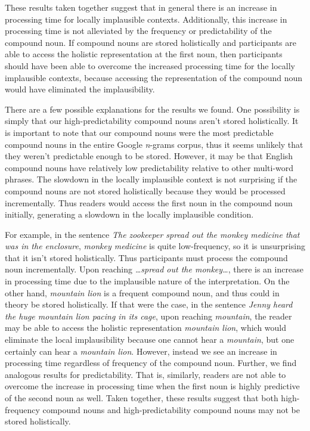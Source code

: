 \documentclass[
  12pt,
  letterpaper,
]{scrreport}
\begin{document}
These results taken together suggest that in general there is an
increase in processing time for locally implausible contexts.
Additionally, this increase in processing time is not alleviated by the
frequency or predictability of the compound noun. If compound nouns are
stored holistically and participants are able to access the holistic
representation at the first noun, then participants should have been
able to overcome the increased processing time for the locally
implausible contexts, because accessing the representation of the
compound noun would have eliminated the implausibility.

There are a few possible explanations for the results we found. One
possibility is simply that our high-predictability compound nouns aren't
stored holistically. It is important to note that our compound nouns
were the most predictable compound nouns in the entire Google
\emph{n}-grams corpus, thus it seems unlikely that they weren't
predictable enough to be stored. However, it may be that English
compound nouns have relatively low predictability relative to other
multi-word phrases. The slowdown in the locally implausible context is
not surprising if the compound nouns are not stored holistically because
they would be processed incrementally. Thus readers would access the
first noun in the compound noun initially, generating a slowdown in the
locally implausible condition.

For example, in the sentence \emph{The zookeeper spread out the monkey
medicine that was in the enclosure}, \emph{monkey medicine} is quite
low-frequency, so it is unsurprising that it isn't stored holistically.
Thus participants must process the compound noun incrementally. Upon
reaching \emph{\ldots spread out the monkey\ldots{}}, there is an
increase in processing time due to the implausible nature of the
interpretation. On the other hand, \emph{mountain lion} is a frequent
compound noun, and thus could in theory be stored holistically. If that
were the case, in the sentence \emph{Jenny heard the huge mountain lion
pacing in its cage}, upon reaching \emph{mountain}, the reader may be
able to access the holistic representation \emph{mountain lion}, which
would eliminate the local implausibility because one cannot hear a
\emph{mountain}, but one certainly can hear a \emph{mountain lion}.
However, instead we see an increase in processing time regardless of
frequency of the compound noun. Further, we find analogous results for
predictability. That is, similarly, readers are not able to overcome the
increase in processing time when the first noun is highly predictive of
the second noun as well. Taken together, these results suggest that both
high-frequency compound nouns and high-predictability compound nouns may
not be stored holistically.
\end{document}
